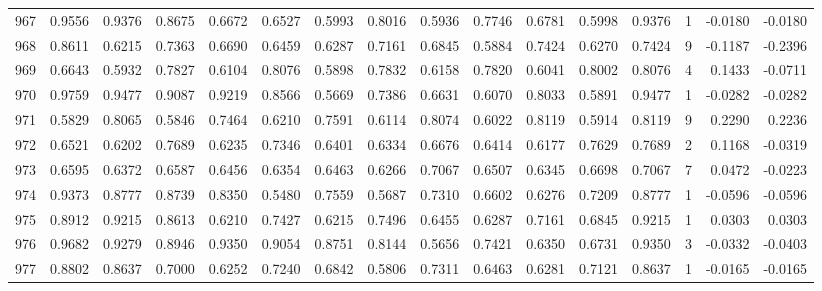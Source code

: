 \begin{tabular}{lrrrrrrrrrrrrrrr}
967 &      0.9556 &  0.9376 &  0.8675 &  0.6672 &  0.6527 &  0.5993 &  0.8016 &  0.5936 &  0.7746 &  0.6781 &   0.5998 &     0.9376 &      1 &                   -0.0180 &                    -0.0180 \\
968 &      0.8611 &  0.6215 &  0.7363 &  0.6690 &  0.6459 &  0.6287 &  0.7161 &  0.6845 &  0.5884 &  0.7424 &   0.6270 &     0.7424 &      9 &                   -0.1187 &                    -0.2396 \\
969 &      0.6643 &  0.5932 &  0.7827 &  0.6104 &  0.8076 &  0.5898 &  0.7832 &  0.6158 &  0.7820 &  0.6041 &   0.8002 &     0.8076 &      4 &                    0.1433 &                    -0.0711 \\
970 &      0.9759 &  0.9477 &  0.9087 &  0.9219 &  0.8566 &  0.5669 &  0.7386 &  0.6631 &  0.6070 &  0.8033 &   0.5891 &     0.9477 &      1 &                   -0.0282 &                    -0.0282 \\
971 &      0.5829 &  0.8065 &  0.5846 &  0.7464 &  0.6210 &  0.7591 &  0.6114 &  0.8074 &  0.6022 &  0.8119 &   0.5914 &     0.8119 &      9 &                    0.2290 &                     0.2236 \\
972 &      0.6521 &  0.6202 &  0.7689 &  0.6235 &  0.7346 &  0.6401 &  0.6334 &  0.6676 &  0.6414 &  0.6177 &   0.7629 &     0.7689 &      2 &                    0.1168 &                    -0.0319 \\
973 &      0.6595 &  0.6372 &  0.6587 &  0.6456 &  0.6354 &  0.6463 &  0.6266 &  0.7067 &  0.6507 &  0.6345 &   0.6698 &     0.7067 &      7 &                    0.0472 &                    -0.0223 \\
974 &      0.9373 &  0.8777 &  0.8739 &  0.8350 &  0.5480 &  0.7559 &  0.5687 &  0.7310 &  0.6602 &  0.6276 &   0.7209 &     0.8777 &      1 &                   -0.0596 &                    -0.0596 \\
975 &      0.8912 &  0.9215 &  0.8613 &  0.6210 &  0.7427 &  0.6215 &  0.7496 &  0.6455 &  0.6287 &  0.7161 &   0.6845 &     0.9215 &      1 &                    0.0303 &                     0.0303 \\
976 &      0.9682 &  0.9279 &  0.8946 &  0.9350 &  0.9054 &  0.8751 &  0.8144 &  0.5656 &  0.7421 &  0.6350 &   0.6731 &     0.9350 &      3 &                   -0.0332 &                    -0.0403 \\
977 &      0.8802 &  0.8637 &  0.7000 &  0.6252 &  0.7240 &  0.6842 &  0.5806 &  0.7311 &  0.6463 &  0.6281 &   0.7121 &     0.8637 &      1 &                   -0.0165 &                    -0.0165 \\

\end{tabular}

